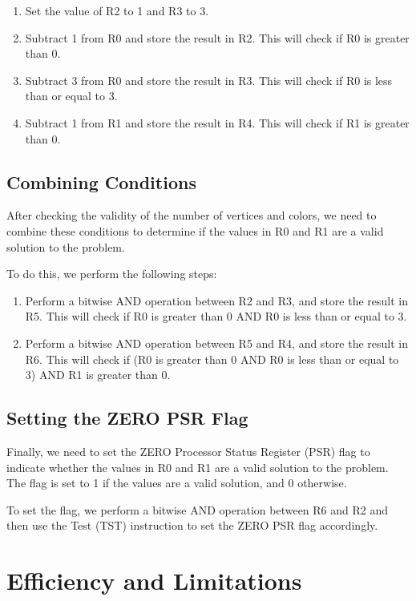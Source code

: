 \begin{enumerate}
    \item Set the value of R2 to 1 and R3 to 3.
    \item Subtract 1 from R0 and store the result in R2. This will check if R0 is greater than 0.
    \item Subtract 3 from R0 and store the result in R3. This will check if R0 is less than or equal to 3.
    \item Subtract 1 from R1 and store the result in R4. This will check if R1 is greater than 0.
\end{enumerate}

\subsection{Combining Conditions}

After checking the validity of the number of vertices and colors, we need to combine these conditions to determine if the values in R0 and R1 are a valid solution to the problem.

To do this, we perform the following steps:

\begin{enumerate}
    \item Perform a bitwise AND operation between R2 and R3, and store the result in R5. This will check if R0 is greater than 0 AND R0 is less than or equal to 3.
    \item Perform a bitwise AND operation between R5 and R4, and store the result in R6. This will check if (R0 is greater than 0 AND R0 is less than or equal to 3) AND R1 is greater than 0.
\end{enumerate}

\subsection{Setting the ZERO PSR Flag}

Finally, we need to set the ZERO Processor Status Register (PSR) flag to indicate whether the values in R0 and R1 are a valid solution to the problem. The flag is set to 1 if the values are a valid solution, and 0 otherwise.

To set the flag, we perform a bitwise AND operation between R6 and R2 and then use the Test (TST) instruction to set the ZERO PSR flag accordingly.

\section{Efficiency and Limitations}

